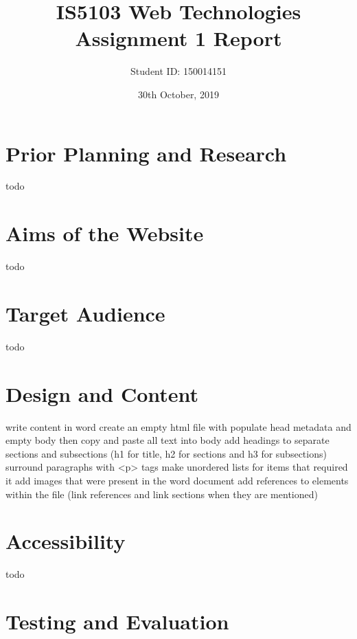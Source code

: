 \documentclass[letterpaper,12pt]{article}
\begin{document}
\title{IS5103 Web Technologies\\Assignment 1 Report}
\author{Student ID: 150014151}
\date{30th October, 2019}
\maketitle
\newpage

\tableofcontents
\newpage



\section{Prior Planning and Research}

todo

\section{Aims of the Website}

todo

\section{Target Audience}

todo

\section{Design and Content}

write content in word
create an empty html file with populate head metadata and empty body
then copy and paste all text into body
add headings to separate sections and subsections (h1 for title, h2 for sections and h3 for subsections)
surround paragraphs with <p> tags
make unordered lists for items that required it
add images that were present in the word document
add references to elements within the file (link references and link sections when they are mentioned) 


\section{Accessibility}

todo

\section{Testing and Evaluation}
\end{document}
